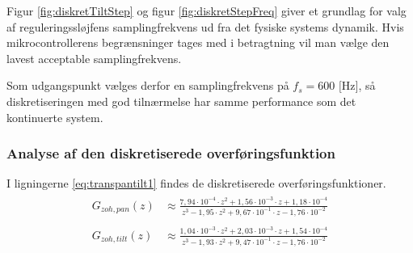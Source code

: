 Figur \ref{fig:diskretTiltStep} og figur \ref{fig:diskretStepFreq}
giver et grundlag for valg af reguleringssløjfens samplingfrekvens ud fra det fysiske systems dynamik.
Hvis mikrocontrollerens begrænsninger tages med i betragtning vil man vælge den lavest acceptable
samplingfrekvens.

Som udgangspunkt vælges derfor en samplingfrekvens på \(f_s=600 \text{ [Hz]}\),
så diskretiseringen med god tilnærmelse har samme performance som det kontinuerte system.

\subsubsection{Analyse af den diskretiserede overføringsfunktion}
I ligningerne \ref{eq:transpantilt1} findes de diskretiserede overføringsfunktioner.
\begin{align}
\label{eq:transpantilt1}
\begin{split}
	G_{zoh,pan}\left(z\right)&\approx\frac{7,94\cdot{}10^{-4}\cdot{}z^2
							+1,56\cdot{}10^{-3}\cdot{}z
							+1,18\cdot{}10^{-4}}
							{z^3 - 1,95\cdot{}z^2+9,67\cdot{}10^{-1}\cdot{z}-1,76\cdot{}10^{-2}}
	\\
	\\
	G_{zoh,tilt}\left(z\right)&\approx\frac{1,04\cdot{}10^{-3}\cdot{}z^2
							+2,03\cdot{}10^{-3}\cdot{}z
							+1,54\cdot{}10^{-4}}
							{z^3 - 1,93\cdot{}z^2+9,47\cdot{}10^{-1}\cdot{z}-1,76\cdot{}10^{-2}}
\end{split}
\end{align}
 
